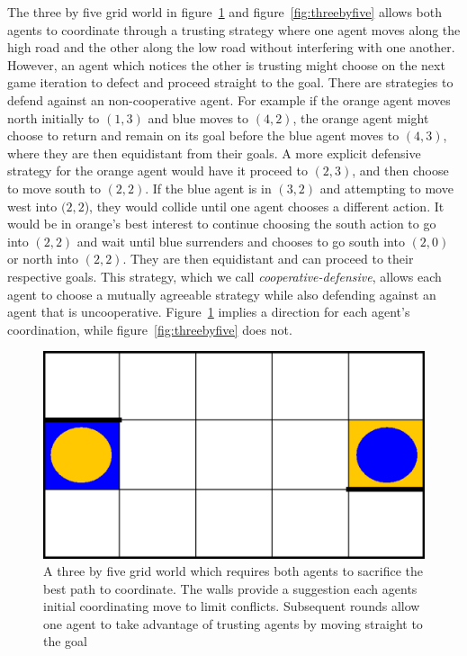 \documentclass[letterpaper]{article}
\begin{document}
The three by five grid world in figure~\ref{fig:threebyfivetwowalls} and figure~\ref{fig:threebyfive} allows both agents to coordinate through a trusting strategy where one agent moves along the high road and the other along the low road without interfering with one another. However, an agent which notices the other is trusting might choose on the next game iteration to defect and proceed straight to the goal. There are strategies to defend against an non-cooperative agent. For example if the orange agent moves north initially to $(1,3)$ and blue moves to $(4,2)$, the orange agent might choose to return and remain on its goal before the blue agent moves to $(4,3)$, where they are then equidistant from their goals. A more explicit defensive strategy for the orange agent would have it proceed to $(2,3)$, and then choose to move south to $(2,2)$. If the blue agent is in $(3,2)$ and attempting to move west into $(2,2$), they would collide until one agent chooses a different action. It would be in orange's best interest to continue choosing the south action to go into $(2,2)$ and wait until blue surrenders and chooses to go south into $(2,0)$ or north into $(2,2)$. They are then equidistant and can proceed to their respective goals. This strategy, which we call \textit{cooperative-defensive}, allows each agent to choose a mutually agreeable strategy while also defending against an agent that is uncooperative. Figure~\ref{fig:threebyfivetwowalls} implies a direction for each agent's coordination, while figure~\ref{fig:threebyfive} does not.

\begin{figure}
\centering
\includegraphics[width=0.8\columnwidth]{figures/threebyfivetwowalls.png}
\caption{A three by five grid world which requires both agents to sacrifice the best path to coordinate. The walls provide a suggestion each agents initial coordinating move to limit conflicts. Subsequent rounds allow one agent to take advantage of trusting agents by moving straight to the goal}
\label{fig:threebyfivetwowalls}
\end{figure}
\end{document}
